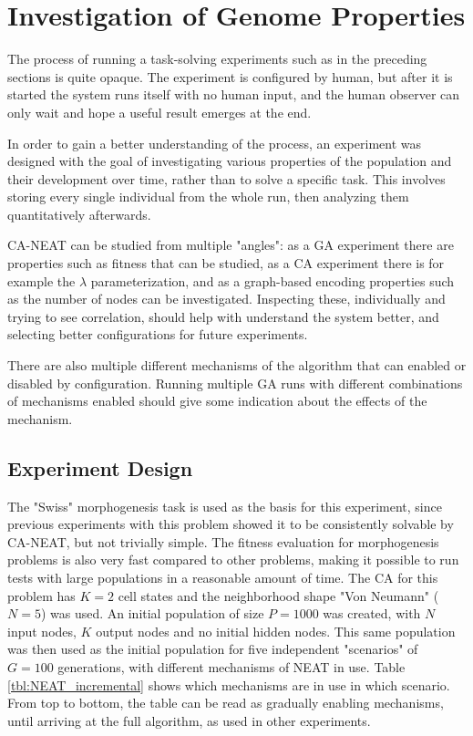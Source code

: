 \section{Investigation of Genome Properties}
\label{sec:properties}
The process of running a task-solving experiments such as in the preceding sections is quite opaque.
The experiment is configured by human, but after it is started the system runs itself with no human input,
and the human observer can only wait and hope a useful result emerges at the end.

In order to gain a better understanding of the process,
an experiment was designed with the goal of investigating various properties of the population and their development over time,
rather than to solve a specific task.
This involves storing every single individual from the whole run, then analyzing them quantitatively afterwards.

CA-NEAT can be studied from multiple "angles": as a GA experiment there are properties such as fitness that can be studied,
as a CA experiment there is for example the $\lambda$ parameterization,
and as a graph-based encoding properties such as the number of nodes can be investigated.
Inspecting these, individually and trying to see correlation, should help with understand the system better,
and selecting better configurations for future experiments.

There are also multiple different mechanisms of the algorithm that can enabled or disabled by configuration.
Running multiple GA runs with different combinations of mechanisms enabled should give some indication about the effects of the mechanism.

\subsection{Experiment Design}
The "Swiss" morphogenesis task is used as the basis for this experiment,
since previous experiments with this problem showed it to be consistently solvable by CA-NEAT, but not trivially simple.
The fitness evaluation for morphogenesis problems is also very fast compared to other problems, making it possible to run tests with large populations in a reasonable amount of time.
The CA for this problem has $K=2$ cell states and the neighborhood shape "Von Neumann" ($N=5$) was used.
An initial population of size $P=1000$ was created, with $N$ input nodes, $K$ output nodes and no initial hidden nodes.
This same population was then used as the initial population for five independent "scenarios" of $G=100$ generations, with different mechanisms of NEAT in use.
Table \ref{tbl:NEAT_incremental} shows which mechanisms are in use in which scenario.
From top to bottom, the table can be read as gradually enabling mechanisms, until arriving at the full algorithm, as used in other experiments.

